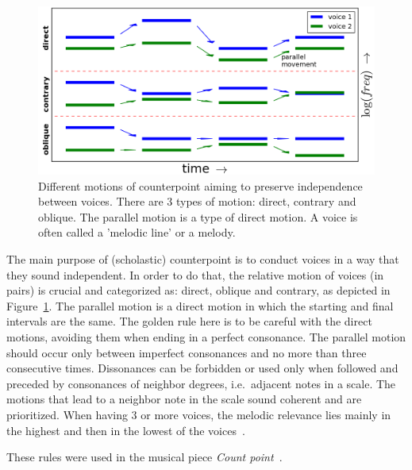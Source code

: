 \documentclass[format=acmsmall, review=false, screen=true]{acmart}
\begin{document}
\begin{figure}[h!]
    \centering
        \includegraphics[width=.8\columnwidth]{figures/movContraponto_}
    \caption{Different motions of counterpoint aiming to preserve independence
        between voices. There are 3 types of motion: direct, contrary and
        oblique. The parallel motion is a type of direct motion.
	A voice is often called a 'melodic line' or a melody.}
        \label{fig:movContraponto}
\end{figure}

The main purpose of (scholastic) counterpoint is to conduct voices in a way that they sound independent.
In order to do that, the relative motion of voices (in pairs) is crucial and
categorized as: direct, oblique and contrary, as depicted in Figure~\ref{fig:movContraponto}.
The parallel motion is a direct motion in which the starting and final intervals are the same.
The golden rule here is to be careful with the direct motions, avoiding them
when ending in a perfect consonance.
The parallel motion should occur only between
imperfect consonances and no more than three consecutive times.
Dissonances can be forbidden or used only when followed and preceded by consonances of neighbor
degrees, i.e.\ adjacent notes in a scale.
The motions that lead to a
neighbor note in the scale sound coherent and are prioritized.
When having 3 or more voices, the melodic
relevance lies mainly in the highest and then in the lowest of the voices~\cite{Fux,Tragtenberg,SchoenbergContra}.

These rules were used in the musical piece \emph{Count point}~\cite{MASSA}.
\end{document}

